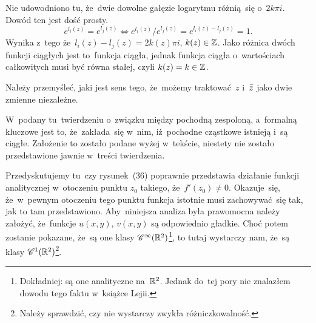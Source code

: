 \documentclass[a4paper,11pt]{article}
\begin{document}
\vspace{\spaceFour}





\noindent
{} Nie udowodniono tu, że~dwie dowolne gałęzie logarytmu różnią~się
o~$2 k \pi i$. Dowód ten jest dość prosty.
\begin{equation}
  \label{eq:Leja-Funkcje-zepolone-38}
  e^{ l_{ i }( z ) } = e^{ l_{ j }( z ) } \iff
  e^{ l_{ i }( z ) } / e^{ l_{ j }( z ) } = e^{ l_{ i }( z ) - l_{ j }( z ) } = 1.
\end{equation}
Wynika z~tego że~$l_{ i }( z ) - l_{ j }( z ) = 2 k( z ) \pi i$,
$k( z ) \in \mathbb{Z}$. Jako różnica dwóch funkcji ciągłych jest
to~funkcja ciągła, jednak funkcja ciągła o~wartościach całkowitych
musi być równa stałej, czyli $k( z ) = k \in \mathbb{Z}$.

\vspace{\spaceFour}





\noindent
{} Należy przemyśleć, jaki jest sens tego, że~możemy traktować~$z$
i~$\bar{z}$ jako dwie zmienne niezależne.

\vspace{\spaceFour}





\noindent
{} W~podany tu~twierdzeniu o~związku między pochodną zespoloną,
a~formalną kluczowe jest to, że~zakłada~się w~nim, iż~pochodne cząstkowe
istnieją i~są ciągłe. Założenie to zostało podane wyżej w~tekście, niestety
nie zostało przedstawione jawnie w~treści twierdzenia.

\vspace{\spaceFour}





\noindent
{} Przedyskutujemy tu~czy rysunek~(36) poprawnie przedstawia
działanie funkcji analitycznej w~otoczeniu punktu $z_{ 0 }$ takiego,
że~$f'( z_{ 0 } ) \neq 0$. Okazuje~się, że~w~pewnym otoczeniu tego punktu
funkcja istotnie musi zachowywać~się tak, jak to tam przedstawiono.
Aby~niniejsza analiza była prawomocna należy założyć, że~funkcje
$u( x, y )$, $v( x, y )$ są odpowiednio gładkie. Choć potem zostanie
pokazane, że~są one klasy $\mathcal{C}^{ \infty }( \mathbb{R}^{ 2 } )$\footnote{Dokładniej:
  są one   analityczne na~$\mathbb{R}^{ 2 }$. Jednak do~tej pory nie znalazłem
  dowodu tego faktu w~książce Lejii.}, to tutaj wystarczy nam, że~są
klasy $\mathcal{C}^{ 1 }( \mathbb{R}^{ 2 } )$\footnote{Należy sprawdzić, czy nie
  wystarczy zwykła różniczkowalność.}.
\end{document}
